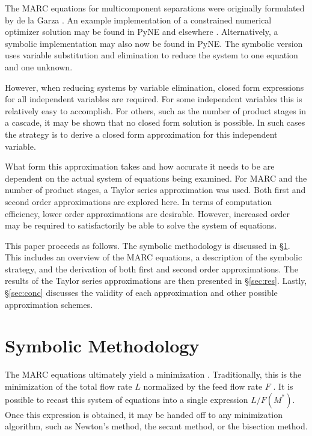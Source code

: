 \documentclass{ansconf}
\begin{document}
The MARC equations for multicomponent separations were originally formulated 
by de la Garza \cite{DelaGarza1969}.
An example implementation of a constrained numerical optimizer solution may be 
found in PyNE and elsewhere \cite{pyne:enrichment,doi:10.1080/01496391003793884}.  
Alternatively, a symbolic implementation may also now be found in PyNE.  The symbolic
version uses variable substitution and elimination to reduce the system to one 
equation and one unknown.

However, when reducing systems by variable elimination, closed form expressions for 
all independent variables are required.  For some independent variables this is 
relatively easy to accomplish. For others, such as the number of product stages in
a cascade, it may be shown that no closed form solution is possible.  In such cases 
the strategy is to derive a closed form approximation for this independent variable.

What form this approximation takes and how accurate it needs to be are dependent on 
the actual system of equations being examined.  For MARC and the number of product
stages, a Taylor series approximation was used.  Both first and second order 
approximations are explored here.  In terms of computation efficiency, lower order 
approximations are desirable.  However, increased order may be required to 
satisfactorily be able to solve the system of equations.

This paper proceeds as follows.  The symbolic methodology 
is discussed in \S\ref{sec:meth}.  This includes an overview of the
MARC equations, a description of the symbolic strategy, and the
derivation of both first and second order approximations.
The results of the Taylor series approximations are then presented in \S\ref{sec:res}. 
Lastly, \S\ref{sec:conc} discusses the validity of each approximation and other
possible approximation schemes.

\section{Symbolic Methodology}
\label{sec:meth}
The MARC equations ultimately yield a minimization \cite{Wood1999}.  Traditionally, 
this is the minimization of the total flow rate $L$ normalized by the feed flow rate 
$F$ \cite{DelaGarza1969}.  It is possible to recast this system of equations 
into a single expression $L/F(M^*)$.  Once this expression is obtained, it 
may be handed off to any minimization algorithm, such as Newton's
method, the secant method, or the bisection method.  
\end{document}
